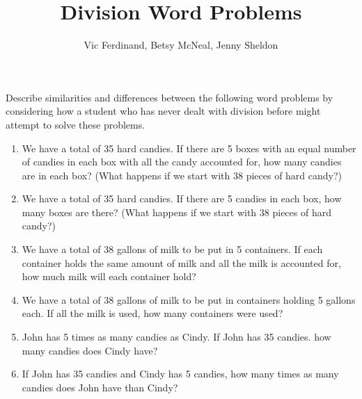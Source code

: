 \documentclass{ximera}
\title{Division Word Problems}
\author{Vic Ferdinand, Betsy McNeal, Jenny Sheldon}
\begin{document}
\begin{abstract} \end{abstract}
\maketitle



\begin{problem}
Describe similarities and differences between the following word problems by considering how a student who has never dealt with division before might attempt to solve these problems.

\begin{enumerate}
\item We have a total of 35 hard candies.  If there are 5 boxes with an equal number of candies in each box with all the candy accounted for, how many candies are in each box? (What happens if we start with 38 pieces of hard candy?)

\item We have a total of 35 hard candies.  If there are 5 candies in each box, how many boxes are there? (What happens if we start with 38 pieces of hard candy?)

\item We have a total of 38 gallons of milk to be put in 5 containers.  If each container holds the same amount of milk and all the milk is accounted for, how much milk will each container hold?

\item We have a total of 38 gallons of milk to be put in containers holding 5 gallons each.  If all the milk is used, how many containers were used?







\item John has 5 times as many candies as Cindy.  If John has 35 candies. how many candies does Cindy have?
\item If John has 35 candies and Cindy has 5 candies, how many times as many candies does John have than Cindy?
\end{enumerate}

\end{problem}
\end{document}
